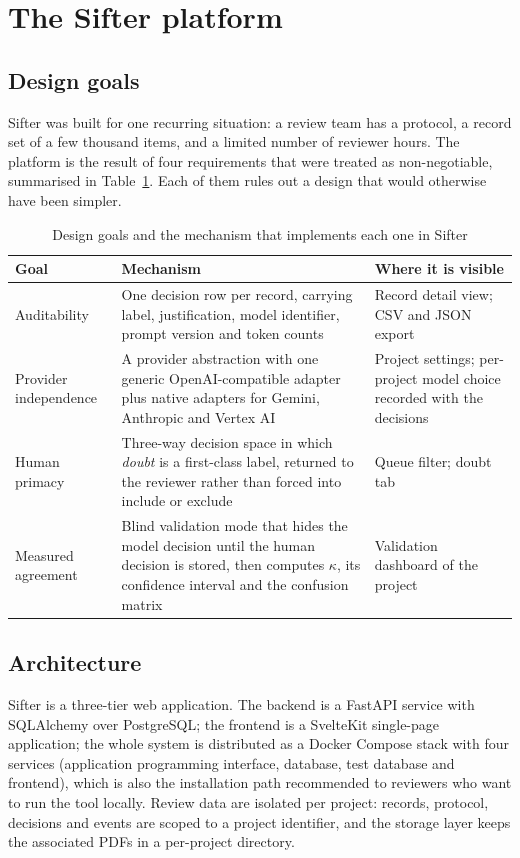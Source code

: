 \section{The Sifter platform}\label{sec:system}

\subsection{Design goals}

Sifter was built for one recurring situation: a review team has a protocol, a
record set of a few thousand items, and a limited number of reviewer hours.
The platform is the result of four requirements that were treated as
non-negotiable, summarised in Table~\ref{tab:goals}. Each of them rules out a
design that would otherwise have been simpler.

\begin{table}[htbp]
\centering
\caption{Design goals and the mechanism that implements each one in Sifter}
\label{tab:goals}
\begin{tabular}{@{}p{}p{}p{}@{}}
\toprule
Goal & Mechanism & Where it is visible \\
\midrule
Auditability &
One decision row per record, carrying label, justification, model identifier,
prompt version and token counts &
Record detail view; CSV and JSON export \\
Provider independence &
A provider abstraction with one generic OpenAI-compatible adapter plus native
adapters for Gemini, Anthropic and Vertex AI &
Project settings; per-project model choice recorded with the decisions \\
Human primacy &
Three-way decision space in which \emph{doubt} is a first-class label, returned
to the reviewer rather than forced into include or exclude &
Queue filter; doubt tab \\
Measured agreement &
Blind validation mode that hides the model decision until the human decision is
stored, then computes $\kappa$, its confidence interval and the confusion
matrix &
Validation dashboard of the project \\
\bottomrule
\end{tabular}
\end{table}

\subsection{Architecture}

Sifter is a three-tier web application. The backend is a FastAPI service with
SQLAlchemy over PostgreSQL; the frontend is a SvelteKit single-page
application; the whole system is distributed as a Docker Compose stack with
four services (application programming interface, database, test database and
frontend), which is also the installation path recommended to reviewers who
want to run the tool locally. Review data are isolated per project: records,
protocol, decisions and events are scoped to a project identifier, and the
storage layer keeps the associated PDFs in a per-project directory.

